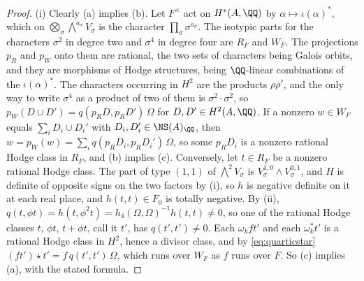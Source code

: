 \begin{proof}
(i) Clearly (a) implies (b). Let $F^{\times}$ act on $H^{*}(A,\QQ)$ by
$\alpha\mapsto\iota(\alpha)^{*}$, which on
$\bigotimes_{\sigma}\bigwedge^{a_{\sigma}}V_{\sigma}$ is the character
$\prod_{\sigma}\sigma^{a_{\sigma}}$. The isotypic parts for the characters
$\sigma^{2}$ in degree two and $\sigma^{4}$ in degree four are $R_{F}$ and
$W_{F}$. The projections $p_{R}$ and $p_{W}$ onto them are rational, the two
sets of characters being Galois orbits, and they are morphisms of Hodge
structures, being $\QQ$-linear combinations of the $\iota(\alpha)^{*}$. The
characters occurring in $H^{2}$ are the products $\rho\rho'$, and the only way
to write $\sigma^{4}$ as a product of two of them is $\sigma^{2}\cdot\sigma^{2}$,
so $p_{W}(D\cup D')=q(p_{R}D,p_{R}D')\,\Omega$ for $D,D'\in H^{2}(A,\QQ)$. If a
nonzero $w\in W_{F}$ equals $\sum_{i}D_{i}\cup D_{i}'$ with
$D_{i},D_{i}'\in\NS(A)_{\QQ}$, then
$w=p_{W}(w)=\sum_{i}q(p_{R}D_{i},p_{R}D_{i}')\,\Omega$, so some $p_{R}D_{i}$ is
a nonzero rational Hodge class in $R_{F}$, and (b) implies (c). Conversely,
let $t\in R_{F}$ be a nonzero rational Hodge class. The part of type $(1,1)$
of $\bigwedge^{2}V_{\sigma}$ is $V_{\sigma}^{1,0}\wedge V_{\sigma}^{0,1}$, and
$H$ is definite of opposite signs on the two factors by (i),
so $h$ is negative definite on it at each real place, and $h(t,t)\in F_{0}$ is
totally negative. By (ii),
$q(t,\phi t)=h(t,\phi^{2}t)=h_{4}(\Omega,\Omega)^{-1}h(t,t)\ne0$, so one of the
rational Hodge classes $t$, $\phi t$, $t+\phi t$, call it $t'$, has
$q(t',t')\ne0$. Each $\omega_{k}ft'$ and each $\omega_{k}^{*}t'$ is a rational
Hodge class in $H^{2}$, hence a divisor class, and by \eqref{eq:quarticstar}
$(ft')\star t'=f\,q(t',t')\,\Omega$, which runs over $W_{F}$ as $f$ runs over
$F$. So (c) implies (a), with the stated formula.


\end{proof}
